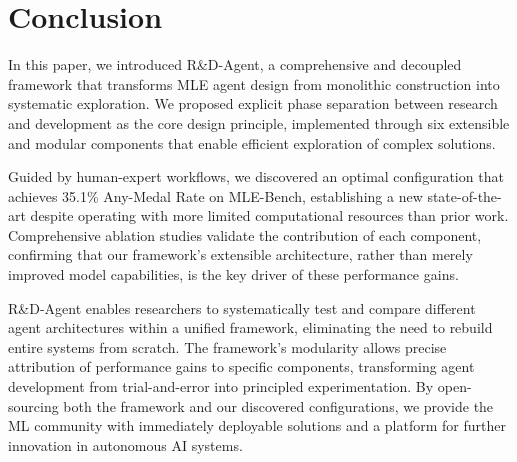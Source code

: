 \section{Conclusion}

In this paper, we introduced R\&D-Agent, a comprehensive and decoupled framework that transforms MLE agent design from monolithic construction into systematic exploration. We proposed explicit phase separation between research and development as the core design principle, implemented through six extensible and modular components that enable efficient exploration of complex solutions.

Guided by human-expert workflows, we discovered an optimal configuration that achieves 35.1\% Any-Medal Rate on MLE-Bench, establishing a new state-of-the-art despite operating with more limited computational resources than prior work. Comprehensive ablation studies validate the contribution of each component, confirming that our framework's extensible architecture, rather than merely improved model capabilities, is the key driver of these performance gains.

R\&D-Agent enables researchers to systematically test and compare different agent architectures within a unified framework, eliminating the need to rebuild entire systems from scratch. The framework's modularity allows precise attribution of performance gains to specific components, transforming agent development from trial-and-error into principled experimentation. By open-sourcing both the framework and our discovered configurations, we provide the ML community with immediately deployable solutions and a platform for further innovation in autonomous AI systems.

